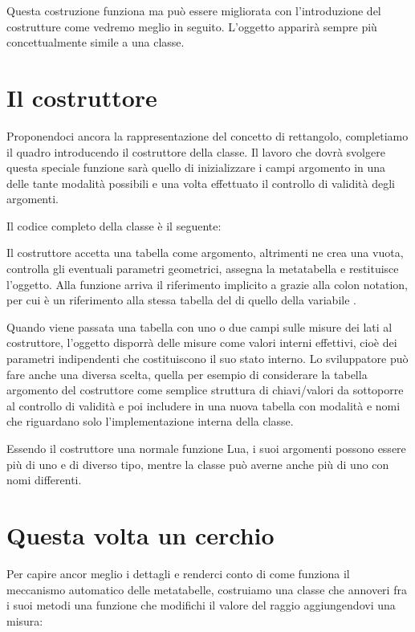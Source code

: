 Questa costruzione funziona ma può essere migliorata con l'introduzione del
costrutture come vedremo meglio in seguito. L'oggetto  apparirà
sempre più concettualmente simile a una classe.


\section{Il costruttore}
\label{secFondCostruttore}

Proponendoci ancora la rappresentazione del concetto di rettangolo, completiamo
il quadro introducendo il costruttore della classe. Il lavoro che dovrà
svolgere questa speciale funzione sarà quello di inizializzare i campi
argomento in una delle tante modalità possibili e una volta effettuato il
controllo di validità degli argomenti.

Il codice completo della classe  è il seguente:

Il costruttore  accetta una tabella come argomento, altrimenti ne crea
una vuota, controlla gli eventuali parametri geometrici, assegna la metatabella
e restituisce l'oggetto. Alla funzione arriva il riferimento implicito a
 grazie alla colon notation, per cui  è un riferimento
alla stessa tabella del di quello della variabile .

Quando viene passata una tabella con uno o due campi sulle misure dei lati al
costruttore, l'oggetto disporrà delle misure come valori interni effettivi,
cioè dei parametri indipendenti che costituiscono il suo stato interno. Lo
sviluppatore può fare anche una diversa scelta, quella per esempio di
considerare la tabella argomento del costruttore come semplice struttura di
chiavi/valori da sottoporre al controllo di validità e poi includere in una
nuova tabella con modalità e nomi che riguardano solo l'implementazione interna
della classe.

Essendo il costruttore una normale funzione Lua, i suoi argomenti possono essere
più di uno e di diverso tipo, mentre la classe può averne anche più di uno con
nomi differenti.


\section{Questa volta un cerchio}

Per capire ancor meglio i dettagli e renderci conto di come funziona il
meccanismo automatico delle metatabelle, costruiamo una classe  che
annoveri fra i suoi metodi una funzione che modifichi il valore del raggio
aggiungendovi una misura:

